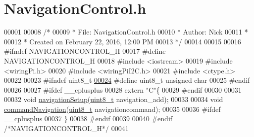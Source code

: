 \hypertarget{NavigationControl_8h_source}{\section{Navigation\+Control.\+h}
\label{NavigationControl_8h_source}
}

\begin{DoxyCode}
00001 
00008 \textcolor{comment}{/* }
00009 \textcolor{comment}{ * File:   NavigationControl.h}
00010 \textcolor{comment}{ * Author: Nick}
00011 \textcolor{comment}{ *}
00012 \textcolor{comment}{ * Created on February 22, 2016, 12:00 PM}
00013 \textcolor{comment}{ */}
00014 
00015 
00016 \textcolor{preprocessor}{#ifndef NAVIGATIONCONTROL\_H}
00017 \textcolor{preprocessor}{#define NAVIGATIONCONTROL\_H}
00018 \textcolor{preprocessor}{#include <iostream>}
00019 \textcolor{preprocessor}{#include <wiringPi.h>}
00020 \textcolor{preprocessor}{#include <wiringPiI2C.h>}
00021 \textcolor{preprocessor}{#include <ctype.h>}
00022 
00023 \textcolor{preprocessor}{#ifndef uint8\_t}
\hypertarget{NavigationControl_8h_source_l00024}{}\hyperlink{NavigationControl_8h_ab077fa1127453be2bd9d4c3c8a768fa7}{00024} \textcolor{preprocessor}{#define uint8\_t unsigned char}
00025 \textcolor{preprocessor}{#endif}
00026 
00027 \textcolor{preprocessor}{#ifdef \_\_cplusplus}
00028 \textcolor{keyword}{extern} \textcolor{stringliteral}{"C"}\{
00029 \textcolor{preprocessor}{#endif}
00030 
00031 
00032 \textcolor{keywordtype}{void} \hyperlink{NavigationControl_8h_acb338a668bf01ea34c27c56db0d23782}{navigationSetup}(\hyperlink{NavigationControl_8h_ab077fa1127453be2bd9d4c3c8a768fa7}{uint8\_t} navigation\_add);
00033 
00034 \textcolor{keywordtype}{void} \hyperlink{NavigationControl_8h_a7534ad4cfb2b6663c3a1d15bb41bd71d}{commandNavigation}(\hyperlink{NavigationControl_8h_ab077fa1127453be2bd9d4c3c8a768fa7}{uint8\_t} navigationcommand);
00035 
00036 \textcolor{preprocessor}{#ifdef \_\_cplusplus}
00037 \}
00038 \textcolor{preprocessor}{#endif }
00039 
00040 \textcolor{preprocessor}{#endif }\textcolor{comment}{/*NAVIGATIONCONTROL\_H*/}\textcolor{preprocessor}{}
00041 
\end{DoxyCode}
